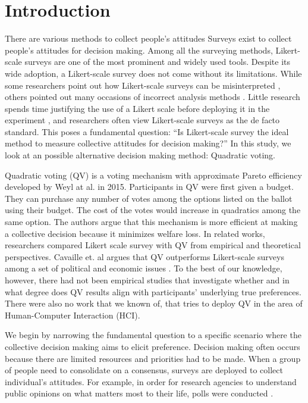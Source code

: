 \section{Introduction}
There are various methods to collect
people's attitudes
Surveys exist 
to collect people's attitudes 
for decision making.
Among all the surveying methods, 
Likert-scale surveys 
are one of the most prominent 
and widely used tools.
Despite its wide adoption,
a Likert-scale survey does not come without its limitations.
While some researchers 
point out how Likert-scale surveys 
can be misinterpreted \cite{jamieson2004likert, pell2005use},
others pointed out many occasions of incorrect analysis methods \cite{bishop2015use}.
Little research spends time
justifying the use of a Likert scale 
before deploying it in the experiment
, and researchers often view 
Likert-scale surveys as the de facto standard.
This poses a fundamental question: 
``Is Likert-scale survey the ideal method
to measure collective attitudes for decision making?''
In this study, we look at an possible alternative
decision making method: Quadratic voting.

Quadratic voting (QV) is a voting mechanism 
with approximate Pareto efficiency 
developed by Weyl at al. \cite{posner2018radical} in 2015.
Participants in QV were first given a budget.
They can purchase any number of votes 
among the options listed on the ballot 
using their budget.
The cost of the votes would increase 
in quadratics among the same option.
The authors argue that 
this mechanism is more efficient 
at making a collective decision 
because it minimizes welfare loss.
In related works, 
researchers compared Likert scale survey with QV 
from empirical and theoretical perspectives\cite{quarfoot2017quadratic, naylor2017first}.
Cavaille et. al argues that 
QV outperforms Likert-scale surveys among a set of political and economic issues \cite{cavaille2018towards}.
To the best of our knowledge, however, 
there had not been empirical studies 
that investigate whether and in what degree
does QV results align with 
participants' underlying true preferences.
There were also no work that we known of,
that tries to deploy QV 
in the area of Human-Computer Interaction (HCI).

We begin by narrowing the fundamental question
to a specific scenario
where the collective decision making aims to
elicit preference.
Decision making often occurs 
because there are limited resources
and priorities had to be made.
When a group of people 
need to consolidate on a consensus,
surveys are deployed 
to collect individual's attitudes.
For example, 
in order for 
research agencies to understand public opinions
on what matters most to their life,
polls were conducted \cite{}.

